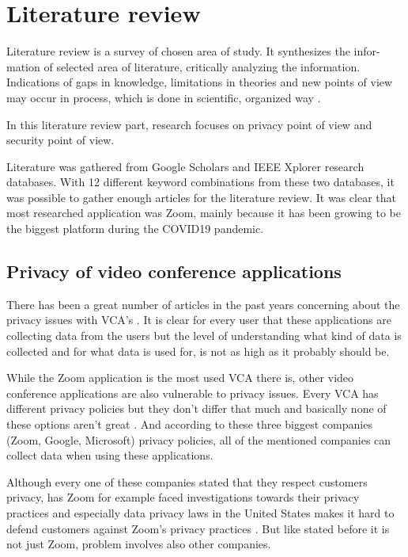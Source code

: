 \documentclass[utf8,english]{gradu3}
\begin{document}
\chapter{Literature review}
\label{literatureReview}
Literature review is a survey of chosen area of study. It synthesizes the infor-
mation of selected area of literature, critically analyzing the information. Indications of gaps in knowledge, limitations in theories and new points of view may occur in process, which is done in scientific, organized way \parencite{literatureRoyal}.

In this literature review part, research focuses on privacy point of view and security point of view.

Literature was gathered from Google Scholars and IEEE Xplorer research databases. With 12 different keyword combinations from these two databases, it was possible to gather enough articles for the literature review. It was clear that most researched application was Zoom, mainly because it has been growing to be the biggest platform during the COVID19 pandemic.

\section{Privacy of video conference applications}
There has been a great number of articles in the past years concerning about the privacy issues with VCA's \parencite{vcadata}. It is clear for every user that these applications are collecting data from the users but the level of understanding what kind of data is collected and for what data is used for, is not as high as it probably should be.

While the Zoom application is the most used VCA there is, other video conference applications are also vulnerable to privacy issues. Every VCA has different privacy policies but they don't differ that much and basically none of these options aren't great \parencite{ZoomGoogleMS}. And according to these three biggest companies (Zoom, Google, Microsoft) privacy policies, all of the mentioned companies can collect data when using these applications. 

Although every one of these companies stated that they respect customers privacy, has Zoom for example faced investigations towards their privacy practices and especially data privacy laws in the United States makes it hard to defend customers against Zoom's privacy practices \parencite{Darkside}. But like stated before it is not just Zoom, problem involves also other companies.
\end{document}

